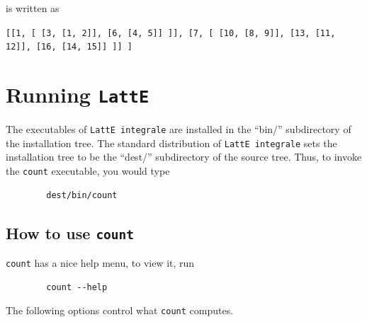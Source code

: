\documentclass{article}
\newcommand{\latteInt}{{\tt LattE integrale}\xspace}
\begin{document}
is written as

\texttt{[[1, [ [3, [1, 2]], [6, [4, 5]] ]], [7, [ [10, [8, 9]], [13, [11, 12]], [16, [14, 15]] ]] ]}



\section{Running {\tt LattE}}\label{Running LattE}

The executables of \latteInt are installed in the ``bin/'' subdirectory of the
installation tree.  The standard distribution of \latteInt sets the installation tree to be the
``dest/'' subdirectory of the source tree. 
Thus, to invoke the {\tt count} executable, you would type
\begin{verbatim}
        dest/bin/count
\end{verbatim}




\subsection{How to use {\tt count}}

{\tt count} has a nice help menu, to view it, run

\begin{verbatim}
        count --help
\end{verbatim}


The following options control what {\tt count} computes.
\end{document}
